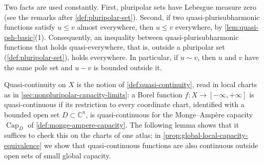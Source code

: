 Two facts are used constantly. First, pluripolar sets have Lebesgue measure zero (see the remarks after \cref{def:pluripolar-set}). Second, if two quasi-plurisubharmonic functions satisfy $u\leq v$ almost everywhere, then $u\leq v$ everywhere, by \cref{lem:quasi-psh-basic}(1). Consequently, an inequality between quasi-plurisubharmonic functions that holds quasi-everywhere, that is, outside a pluripolar set (\cref{def:pluripolar-set}), holds everywhere. In particular, if $u\sim v$, then $u$ and $v$ have the same pole set and $u-v$ is bounded outside it.

Quasi-continuity on $X$ is the notion of \cref{def:quasi-continuity}, read in local charts as in \cref{sec:nonpluripolar-capacity-limits}: a Borel function $f\colon X\to[-\infty,+\infty]$ is quasi-continuous if its restriction to every coordinate chart, identified with a bounded open set $D\subset\mathbb C^n$, is quasi-continuous for the Monge--Amp\`ere capacity $\operatorname{Cap}_D$ of \cref{def:monge-ampere-capacity}. The following lemma shows that it suffices to check this on the charts of one atlas; in \cref{prop:global-local-capacity-equivalence} we show that quasi-continuous functions are also continuous outside open sets of small global capacity.

